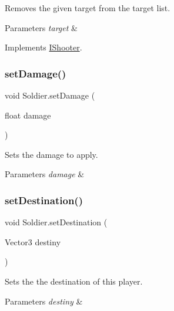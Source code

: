 Removes the given target from the target list. 


\begin{DoxyParams}{Parameters}
{\em target} & \\
\hline
\end{DoxyParams}


Implements \mbox{\hyperlink{interface_i_shooter}{I\+Shooter}}.

\mbox{\label{class_soldier_acac1c7daba930c5322aedffb7649a68c}} 
\subsubsection{\texorpdfstring{set\+Damage()}{setDamage()}}
{\footnotesize\ttfamily void Soldier.\+set\+Damage (\begin{DoxyParamCaption}\item[{float}]{damage }\end{DoxyParamCaption})}



Sets the damage to apply. 


\begin{DoxyParams}{Parameters}
{\em damage} & \\
\hline
\end{DoxyParams}
\mbox{\label{class_soldier_adf9e89f9bf3b2a2dcdc00c91b2d40cfc}} 
\subsubsection{\texorpdfstring{set\+Destination()}{setDestination()}}
{\footnotesize\ttfamily void Soldier.\+set\+Destination (\begin{DoxyParamCaption}\item[{Vector3}]{destiny }\end{DoxyParamCaption})}



Sets the the destination of this player. 


\begin{DoxyParams}{Parameters}
{\em destiny} & \\
\hline
\end{DoxyParams}
\mbox{\label{class_soldier_ada823422571bc252817e9a3ed2e1db67}} 

